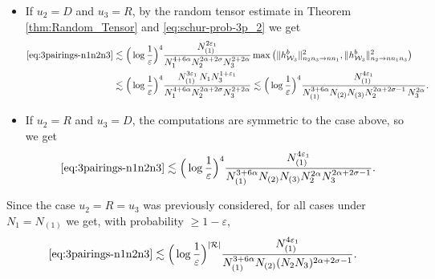 \documentclass[11pt, xcolor = dvipsnames,reqno
]{amsart}
\theoremstyle{definition}
\theoremstyle{remark}
\begin{document}
\begin{itemize}
\begin{itemize}
            by Schur's test and the counting in \eqref{eq:schur-prob-3p}
            we directly bound
            \begin{align}
                \eqref{eq:3pairings-n1n2n3} 
                \lesssim
                \Big(\log  \frac{1}{\varepsilon} \Big)^3 \frac{N_1^{\varepsilon_1}}{N_1^{4+6\alpha} (N_2 N_3)^{ 2\alpha + 2\sigma}}  \lVert h_{\mathcal W_3}^b \rVert_{n_2n_3 \to nn_1}^2 
                & \lesssim \Big(\log  \frac{1}{\varepsilon} \Big)^3  \frac{N_1^{\varepsilon_1} N_1 \min_{\{2,3\}}}{N_1^{4 + 6\alpha} \, (N_2 N_3)^{2\alpha + 2\sigma}} \\
                &\lesssim \Big(\log  \frac{1}{\varepsilon} \Big)^3  \frac{N_{(1)}^{\varepsilon_1}}{N_{(1)}^{3 + 6\alpha} \, \max_{\{2,3\}}  (N_2N_3)^{2\alpha + 2\sigma - 1 }}.
            \end{align}

            \item If $u_2 = D$ and $u_3 = R$, 
            by the random tensor estimate in Theorem \ref{thm:Random_Tensor} and \eqref{eq:schur-prob-3p_2} we get 
            \begin{align}
                \eqref{eq:3pairings-n1n2n3}
                & \lesssim
                \Big(\log  \frac{1}{\varepsilon} \Big)^4 \frac{N_{(1)}^{2\varepsilon_1}}{N_1^{4+6\alpha} N_2^{ 2\alpha + 2\sigma} N_3^{ 2 + 2\alpha}} 
                \max \big( \lVert h^b_{\mathcal W_3} \rVert_{n_2n_3 \to nn_1}^2, \lVert h^b_{\mathcal W_3} \rVert_{n_2 \to nn_1n_3}^2 \big) \\
                & \lesssim \Big(\log  \frac{1}{\varepsilon} \Big)^4 \frac{N_{(1)}^{3\varepsilon_1} \, N_1 N_3^{1+\varepsilon_1}}{N_1^{4 + 6\alpha}N_2^{ 2\alpha + 2\sigma}N_3^{2 +  2\alpha}}   \lesssim \Big(\log  \frac{1}{\varepsilon} \Big)^4 \frac{N_{(1)}^{4\varepsilon_1}}{N_{(1)}^{3+6\alpha} N_{(2)} N_{(3)}  N_2^{ 2\alpha + 2\sigma - 1} \, N_3^{ 2\alpha}}.
            \end{align}

            \item If $u_2 = R$ and $u_3 = D$, the computations are symmetric to the case above, so we get 
            \begin{align}
                \eqref{eq:3pairings-n1n2n3}
                \lesssim \Big(\log  \frac{1}{\varepsilon} \Big)^4 \frac{N_{(1)}^{4\varepsilon_1}}{N_{(1)}^{3+6\alpha} N_{(2)} N_{(3)} N_2^{ 2\alpha}  N_3^{2\alpha +  2\sigma - 1}}.
            \end{align}
        \end{itemize}
        Since the case $u_2 = R = u_3$ was previously considered,  
        for all cases under $N_1 = N_{(1)}$ we get, with probability $\geq 1 - \varepsilon$,
            \begin{align*}
                \eqref{eq:3pairings-n1n2n3}
                & \lesssim \Big(\log  \frac{1}{\varepsilon} \Big)^{|\mathcal R|}\frac{N_{(1)}^{4\varepsilon_1}}{N_{(1)}^{3+6\alpha}N_{(2)} (N_2N_3)^{2\alpha + 2\sigma - 1}}.
            \end{align*}


\end{itemize}
\end{document}
